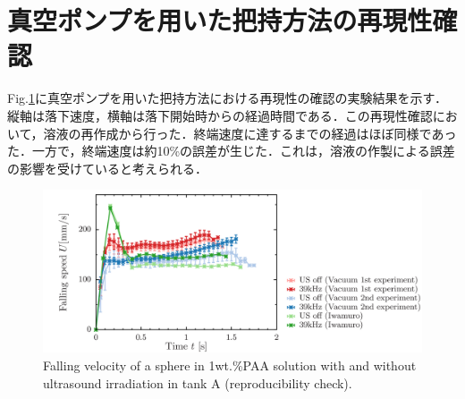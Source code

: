 \section{真空ポンプを用いた把持方法の再現性確認}
\label{sec:reexp}

Fig.\ref{fig:re-exp-vaccume}に真空ポンプを用いた把持方法における再現性の確認の実験結果を示す．縦軸は落下速度，横軸は落下開始時からの経過時間である．この再現性確認において，溶液の再作成から行った．終端速度に達するまでの経過はほぼ同様であった．一方で，終端速度は約10\%の誤差が生じた．これは，溶液の作製による誤差の影響を受けていると考えられる．

\begin{figure}[ht]
    \centering
    \includegraphics[width=14cm,clip]{X-Appendix/reexp.png}
    \caption{Falling velocity of a sphere in 1wt.\%PAA solution with and without ultrasound irradiation in tank A (reproducibility check).}
    \label{fig:re-exp-vaccume}
\end{figure}
